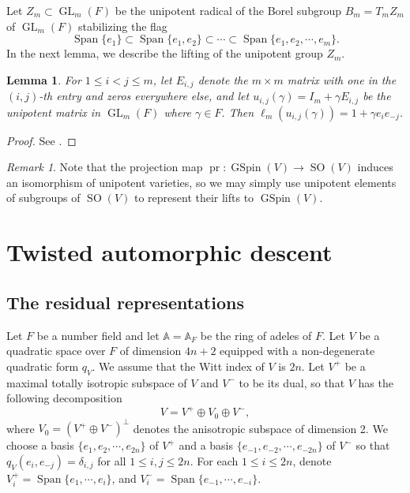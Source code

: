 \documentclass[12pt]{amsart}
\newcommand{\A}{\mathbb{A}}
\newcommand{\Span}{\operatorname{Span}}
\newtheorem{lemma}[theorem]{Lemma}
\theoremstyle{remark}
\newtheorem{remark}[theorem]{Remark}%
\newcommand{\pr}{\operatorname{pr}}
\DeclareMathOperator{\GL}{GL}
\DeclareMathOperator{\SO}{SO}
\DeclareMathOperator{\GSpin}{GSpin}
\begin{document}
Let $Z_m\subset \GL_m(F)$ be the unipotent radical of the Borel subgroup $B_m=T_m Z_m$ of $\GL_m(F)$ stabilizing the flag
\begin{equation*}
\Span\{e_1\} \subset \Span\{e_1, e_2\} \subset \cdots \subset \Span\{e_1, e_2, \cdots, e_m\}.	
\end{equation*}
In the next lemma, we describe the lifting of the unipotent group $Z_m$.

\begin{lemma}
\label{lemma-Levi-Unipotent-lifting}
For $1\le i <j\le m$, let $E_{i,j}$ denote the $m\times m$ matrix with one in the $(i,j)$-th entry and zeros everywhere else, and let $u_{i,j}(\gamma)=I_m + \gamma  E_{i,j}$ be the unipotent matrix in $\GL_m(F)$ where $\gamma \in F$. Then $\ell_m(u_{i,j}(\gamma))=1+\gamma  e_i e_{-j}$. 
\end{lemma}

\begin{proof}
See \cite[Lemma 2.6]{Yan2025}.	
\end{proof}


\begin{remark}
\label{remark-unipotent-variety-isomorphism}
Note that the projection map $\pr:\GSpin(V)\to \SO(V)$ induces an isomorphism of unipotent varieties, so we may simply use unipotent elements of subgroups of $\SO(V)$ to represent their lifts to $\GSpin(V)$.
\end{remark}

 




\section{Twisted automorphic descent}
\label{section-twisted-auto-descent}

\subsection{The residual representations}
Let $F$ be a number field and let $\A=\A_F$ be the ring of adeles of $F$.
Let $V$ be a quadratic space over $F$ of dimension $4n+2$ equipped with a non-degenerate quadratic form $q_V$. 
We assume that the Witt index of $V$ is $2n$. 
Let $V^+$ be a maximal totally isotropic subspace of $V$ and $V^-$ to be its dual, so that $V$ has the following decomposition
\begin{equation*}
V=V^+\oplus V_0 \oplus V^-,	
\end{equation*}
where $V_0=(V^+\oplus V^-)^\perp$ denotes the anisotropic subspace of dimension 2. 
We choose a basis $\{e_1, e_2, \cdots, e_{2n}\}$ of $V^+$ and a basis $\{e_{-1}, e_{-2}, \cdots, e_{-2n}\}$ of $V^-$ so that $q_V(e_i, e_{-j})=\delta_{i,j}$ for all $1\le i, j\le 2n$. For each $1\le i \le 2n$, denote $V_i^+=\Span\{e_1, \cdots, e_i \}$, and $V_i^{-}=\Span\{e_{-1}, \cdots, e_{-i}\}$.
\end{document}
